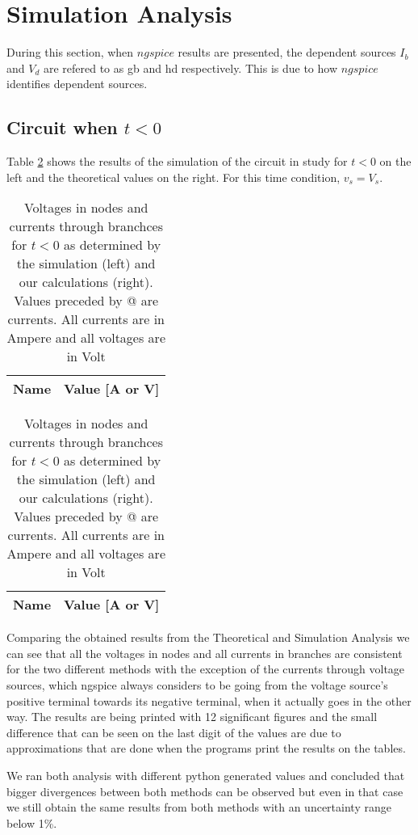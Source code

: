 \section{Simulation Analysis}
\label{sec:simulation}

During this section, when $ngspice$ results are presented, the dependent sources $I_b$ and $V_d$ are refered to as gb and hd respectively. This is due to how $ngspice$ identifies dependent sources.

\subsection{Circuit when $t<0$}

Table \ref{tab:comparison1} shows the results of the simulation of the circuit in study for $t<0$ on the left and the theoretical values on the right. For this time condition, $v_s = V_s$. 

\begin{table}[H]
  \centering
  \begin{tabular}{|c|c|}
    \hline    
    {\bf Name} & {\bf Value [A or V]} \\ \hline
    
  \end{tabular}
  \begin{tabular}{|c|c|}
    \hline    
    {\bf Name} & {\bf Value [A or V]} \\ \hline
    
  \end{tabular}
  \caption{Voltages in nodes and currents through branchces for $t<0$ as determined by the simulation (left) and our calculations (right). Values preceded by @ are currents. All currents are in Ampere and all voltages are in Volt}
  \label{tab:comparison1}
\end{table}

Comparing the obtained results from the Theoretical and Simulation Analysis we can see that all the voltages in nodes and all currents in branches are consistent for the two different methods with the exception of the currents through voltage sources, which ngspice always considers to be going from the voltage source's positive terminal towards its negative terminal, when it actually goes in the other way. The results are being printed with 12 significant figures and the small difference that can be seen on the last digit of the values are due to approximations that are done when the programs print the results on the tables.


We ran both analysis with different python generated values and concluded that bigger divergences between both methods can be observed but even in that case we still obtain the same results from both methods with an uncertainty range below 1\%. 

